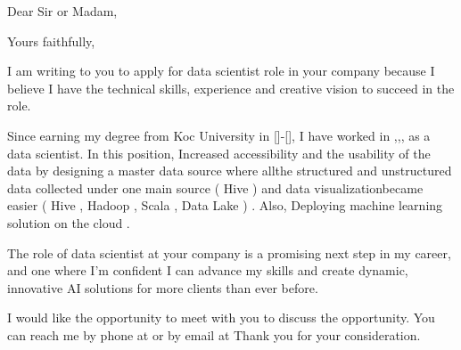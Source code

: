 \documentclass[11pt,a4paper,sans]{moderncv}        %
\begin{document}
\recipient{\quad}{\quad}
\date{March 06 2020}
\opening{Dear Sir or Madam,}
\closing{Yours faithfully,}
\makelettertitle

I am writing to you to apply for data scientist role in your company because I believe I have the technical skills, experience and creative vision to succeed in the role.



Since earning my degree from Koc University  in []-[], I have worked in ,,, as a data scientist. In this position, Increased accessibility and the usability of the data by designing a master data source where allthe structured and unstructured data collected under one main source ( Hive ) and data visualizationbecame easier ( Hive , Hadoop , Scala , Data Lake ) . Also, Deploying machine learning solution on the cloud . 

The role of data scientist at your company is a promising next step in my career, and one where I’m confident I can advance my skills and create dynamic, innovative AI solutions for more clients than ever before.


I would like the opportunity to meet with you to discuss the opportunity. You can reach me by phone at  or by email at 
Thank you for your consideration.


\makeletterclosing
\end{document}
